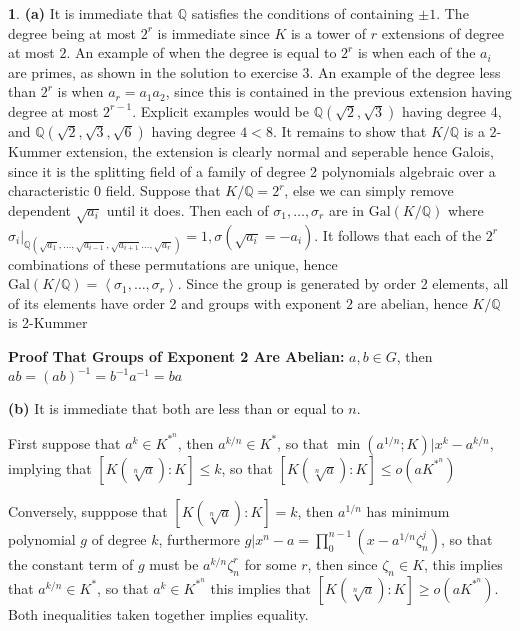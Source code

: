\documentclass[11pt]{article}
\theoremstyle{definition}
\newtheorem{pb}{}
\newcommand{\gen}[1]{\left\langle #1 \right\rangle}
\newcommand{\gal}{\text{Gal}}
\begin{document}
    \begin{pb}
        \textbf{(a)}
            It is immediate that \(\mathbb{Q}\) satisfies the conditions of containing \(\pm 1\). The degree being at most \(2^r\) is immediate since \(K\) is a tower of \(r\) extensions of degree at most \(2\). An example of when the degree is equal to \(2^r\) is when each of the \(a_i\) are primes, as shown in the solution to exercise 3. An example of the degree less than \(2^r\) is when \(a_r = a_1a_2\), since this is contained in the previous extension having degree at most \(2^{r-1}\). Explicit examples would be \(\mathbb{Q}(\sqrt{2},\sqrt{3})\) having degree 4, and \(\mathbb{Q}(\sqrt{2},\sqrt{3},\sqrt{6})\) having degree \(4 < 8\). It remains to show that \(K/\mathbb{Q}\) is a \(2\)-Kummer extension, the extension is clearly normal and seperable hence Galois, since it is the splitting field of a family of degree 2 polynomials algebraic over a characteristic 0 field. Suppose that \(K/\mathbb{Q} = 2^r\), else we can simply remove dependent \(\sqrt{a_i}\) until it does. Then each of \(\sigma_1,\hdots,\sigma_r\) are in \(\gal(K/\mathbb{Q})\)
            where \(\sigma_i\vert_{\mathbb{Q}(\sqrt{a_1},\hdots,\sqrt{a_{i-1}},\sqrt{a_{i+1}}\hdots,\sqrt{a_r})} = 1, \sigma(\sqrt{a_i} = -a_i)\). It follows that each of the \(2^r\) combinations of these permutations are unique, hence \(\gal(K/\mathbb{Q}) = \gen{\sigma_1,\hdots,\sigma_r}\). Since the group is generated by order 2 elements, all of its elements have order 2 and groups with exponent \(2\) are abelian, hence \(K/\mathbb{Q}\) is 2-Kummer

            \textbf{Proof That Groups of Exponent 2 Are Abelian:} \(a,b \in G\), then
            \(ab = (ab)^{-1} = b^{-1}a^{-1} = ba\)


        \textbf{(b)} It is immediate that both are less than or equal to \(n\).
        
        First suppose that \(a^k \in K^{*^n}\), then \(a^{k/n} \in K^*\), so that \(\min(a^{1/n};K) \vert x^k -a^{k/n}\), implying that
        \([K(\sqrt[n]{a}):K] \leq k\), so that \([K(\sqrt[n]{a}):K] \leq o(aK^{*^n})\)

        Conversely, supppose that \([K(\sqrt[n]{a}):K] = k\), then \(a^{1/n}\) has minimum polynomial \(g\) of degree \(k\), furthermore 
        \(g \vert x^n - a = \prod_0^{n-1} (x - a^{1/n}\zeta_n^j)\), so that the constant term of \(g\) must be \(a^{k/n}\zeta_n^r\) for some \(r\), then since \(\zeta_n \in K\), this implies that \(a^{k/n} \in K^*\), so that
        \(a^{k} \in K^{*^n}\) this implies that \([K(\sqrt[n]{a}):K] \geq o(aK^{*^n})\). Both inequalities taken together implies equality.
    \end{pb}
\end{document}
